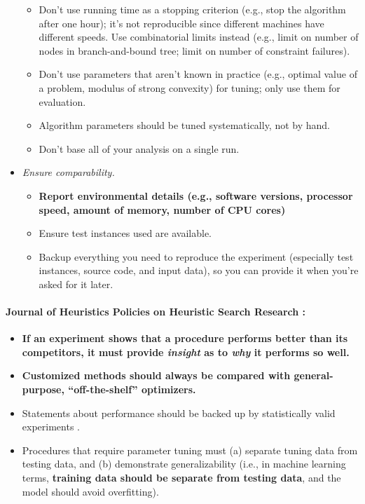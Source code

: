 \documentclass[12pt]{article}
\begin{document}
\begin{itemize}
\begin{itemize}
            \item Don't use running time as a stopping criterion (e.g., stop the algorithm after one hour); it's not reproducible since different machines have different speeds. Use combinatorial limits instead (e.g., limit on number of nodes in branch-and-bound tree; limit on number of constraint failures).
            \item Don't use parameters that aren't known in practice (e.g., optimal value of a problem, modulus of strong convexity) for tuning; only use them for evaluation.
            \item Algorithm parameters should be tuned systematically, not by hand.
            \item Don't base all of your analysis on a single run.
        \end{itemize}
    \item \emph{Ensure comparability.}
        \begin{itemize}
            \item \textbf{Report environmental details (e.g., software versions, processor speed, amount of memory, number of CPU cores)}
            \item Ensure test instances used are available.
            \item Backup everything you need to reproduce the experiment (especially test instances, source code, and input data), so you can provide it when you're asked for it later.
        \end{itemize}
\end{itemize}

\paragraph{Journal of Heuristics Policies on Heuristic Search Research \cite{JOHpolicies}:}
\begin{itemize}
    \item \textbf{If an experiment shows that a procedure performs better than its competitors, it must provide \emph{insight} as to \emph{why} it performs so well.}
    \item \textbf{Customized methods should always be compared with general-purpose, ``off-the-shelf'' optimizers.}
    \item Statements about performance should be backed up by statistically valid experiments \cite{coffin2000statistical}.
    \item Procedures that require parameter tuning must (a) separate tuning data from testing data, and (b) demonstrate generalizability (i.e., in machine learning terms, \textbf{training data should be separate from testing data}, and the model should avoid overfitting).
\end{itemize}
\end{document}
